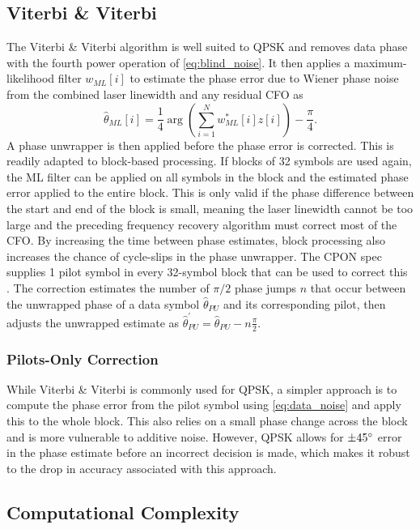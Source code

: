 \documentclass[12pt,a4paper]{article}
\begin{document}
\subsection{Viterbi \& Viterbi}
The Viterbi \& Viterbi algorithm is well suited to QPSK and removes data phase with the fourth power operation of \cref{eq:blind_noise}. It then applies a maximum-likelihood filter \(w_{ML}[i]\) to estimate the phase error due to Wiener phase noise from the combined laser linewidth and any residual CFO as
\begin{equation}
    \hat{\theta}_{ML}[i] = \frac{1}{4} \arg\left(\sum_{i = 1}^{N} w_{ML}^*[i] z[i] \right) - \frac{\pi}{4}.
\end{equation}
A phase unwrapper is then applied before the phase error is corrected. This is readily adapted to block-based processing. If blocks of 32 symbols are used again, the ML filter can be applied on all symbols in the block and the estimated phase error applied to the entire block. This is only valid if the phase difference between the start and end of the block is small, meaning the laser linewidth cannot be too large and the preceding frequency recovery algorithm must correct most of the CFO. By increasing the time between phase estimates, block processing also increases the chance of cycle-slips in the phase unwrapper. The CPON spec supplies 1 pilot symbol in every 32-symbol block that can be used to correct this \cite{Cheng2013PilotCycleSlip}. The correction estimates the number of \(\pi/2\) phase jumps \(n\) that occur between the unwrapped phase of a data symbol \(\hat{\theta}_{PU}\) and its corresponding pilot, then adjusts the unwrapped estimate as \(\hat{\theta}_{PU}^{'} = \hat{\theta}_{PU} - n\frac{\pi}{2}\).
\subsubsection{Pilots-Only Correction}
While Viterbi \& Viterbi is commonly used for QPSK, a simpler approach is to compute the phase error from the pilot symbol using \cref{eq:data_noise} and apply this to the whole block. This also relies on a small phase change across the block and is more vulnerable to additive noise. However, QPSK allows for \(\pm 45\degree\) error in the phase estimate before an incorrect decision is made, which makes it robust to the drop in accuracy associated with this approach.

\subsection{Computational Complexity}
\end{document}
